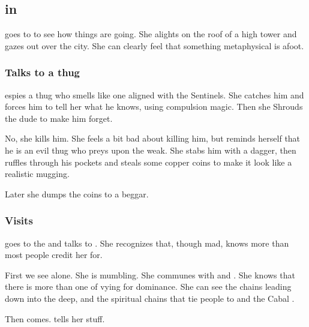 








\subsection[Criseis in Malcur]{\Criseis in \Malcur}
\Criseis goes to \Malcur to see how things are going. 
She alights on the roof of a high tower and gazes out over the city. 
She can clearly feel that something metaphysical is afoot. 





\subsubsection{Talks to a thug}
\Criseis{} espies a thug who smells like one aligned with the Sentinels. 
She catches him and forces him to tell her what he knows, using compulsion magic. 
Then she Shrouds the dude to make him forget. 

No, she kills him. 
She feels a bit bad about killing him, but reminds herself that he is an evil thug who preys upon the weak. 
She stabs him with a dagger, then ruffles through his pockets and steals some copper coins to make it look like a realistic mugging. 

Later she dumps the coins to a beggar. 





\subsubsection{Visits \Uswa}
\Criseis{} goes to the  and talks to . 
She recognizes that, though mad, \Uswa{} knows more than most people credit her for. 

First we see \Uswa{} alone. 
She is mumbling. 
She communes with  and . 
She knows that there is more than one  of  vying for dominance. 
She can see the chains leading down into the deep, and the spiritual chains that tie people to \Nyx{} and the Cabal \Matrix. 

Then \Criseis{} comes. 
\Uswa{} tells her stuff. 

